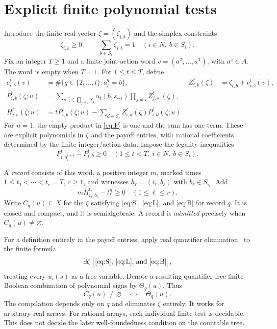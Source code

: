 \documentclass[11pt,a4paper]{article}
\theoremstyle{definition}
\begin{document}
\section{Explicit finite polynomial tests}

Introduce the finite real vector $\zeta=(\zeta_{i,b})$ and the simplex
constraints
\begin{equation}\tag{S}\label{eq:S}
 \zeta_{i,b}\ge0,\qquad \sum_{b\in S_i}\zeta_{i,b}=1
 \quad(i\in N,\ b\in S_i).
\end{equation}
Fix an integer $T\ge1$ and a finite joint-action word
$v=(a^2,\ldots,a^T)$, with $a^q\in A$. The word is empty when $T=1$.
For $1\le t\le T$, define
\begin{align}
 c_{i,b}^t(v)&=\#\{q\in\{2,\ldots,t\}:a_i^q=b\},
 &Z_{i,b}^t(\zeta)&=\zeta_{i,b}+c_{i,b}^t(v),\label{eq:counts}\\
 P_{i,b}^t(\zeta;u)&=
 \sum_{s_{-i}\in\prod_{j\ne i}S_j}
 u_i(b,s_{-i})\prod_{j\ne i}Z_{j,s_j}^t(\zeta),\label{eq:P}\\
 H_{i,b}^t(\zeta;u)&=
 tP_{i,b}^t(\zeta;u)
 -\sum_{d\in S_i}Z_{i,d}^t(\zeta)P_{i,d}^t(\zeta;u).
 \label{eq:H}
\end{align}
For $n=1$, the empty product in \eqref{eq:P} is one and the sum has one
term. These are explicit polynomials in $\zeta$ and the payoff entries,
with rational coefficients determined by the finite integer/action data.
Impose the legality inequalities
\begin{equation}\tag{L}\label{eq:L}
 P_{i,a_i^{t+1}}^t-P_{i,b}^t\ge0
 \quad(1\le t<T,\ i\in N,\ b\in S_i).
\end{equation}

A \emph{record} consists of this word, a positive integer $m$, marked
times $1\le t_1<\cdots<t_r=T$, $r\ge1$, and witnesses
$h_\ell=(i_\ell,b_\ell)$ with $b_\ell\in S_{i_\ell}$. Add
\begin{equation}\tag{B}\label{eq:B}
 mH_{i_\ell,b_\ell}^{t_\ell}-t_\ell^n\ge0
 \quad(1\le\ell\le r).
\end{equation}
Write $C_q(u)\subseteq X$ for the $\zeta$ satisfying
\eqref{eq:S}, \eqref{eq:L}, and \eqref{eq:B} for record $q$.
It is closed and compact, and it is semialgebraic. A record is
\emph{admitted} precisely when $C_q(u)\ne\varnothing$.

For a definition entirely in the payoff entries, apply real quantifier
elimination~\cite{tarski} to the finite formula
\begin{equation}\label{eq:QE}
 \exists\zeta\;\bigl[\text{\eqref{eq:S}, \eqref{eq:L}, and \eqref{eq:B}}
 \bigr],
\end{equation}
treating every $u_i(s)$ as a free variable. Denote a resulting
quantifier-free finite Boolean combination of polynomial signs by
$\Theta_q(u)$. Thus
\begin{equation}\label{eq:admission}
 C_q(u)\ne\varnothing\quad\Longleftrightarrow\quad\Theta_q(u).
\end{equation}
The compilation depends only on $q$ and eliminates $\zeta$ entirely.
It works for arbitrary real arrays. For rational arrays, each individual
finite test is decidable. This does not decide the later well-foundedness
condition on the countable tree.
\end{document}
